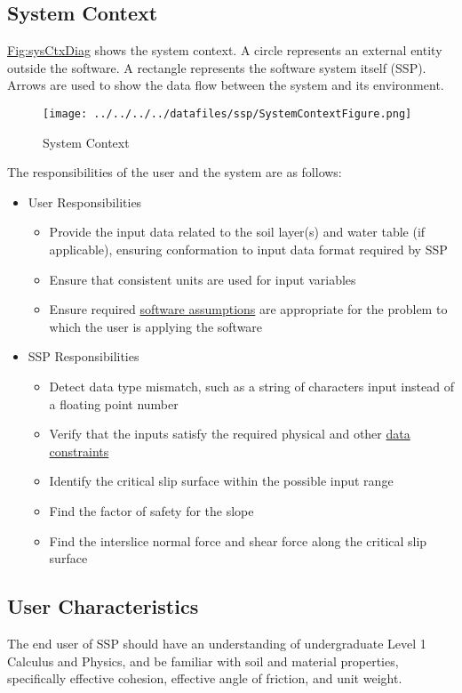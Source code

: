 \documentclass[12pt]{article}
\begin{document}
\subsection{System Context}
\label{Sec:SysContext}
\hyperref[Figure:sysCtxDiag]{Fig:sysCtxDiag} shows the system context. A circle represents an external entity outside the software. A rectangle represents the software system itself (SSP). Arrows are used to show the data flow between the system and its environment.

\begin{figure}
\begin{center}
\texttt{[image: ../../../../datafiles/ssp/SystemContextFigure.png]}
\caption{System Context}
\label{Figure:sysCtxDiag}
\end{center}
\end{figure}
The responsibilities of the user and the system are as follows:

\begin{itemize}
\item{User Responsibilities}
\begin{itemize}
\item{Provide the input data related to the soil layer(s) and water table (if applicable), ensuring conformation to input data format required by SSP}
\item{Ensure that consistent units are used for input variables}
\item{Ensure required \hyperref[Sec:Assumps]{software assumptions} are appropriate for the problem to which the user is applying the software}
\end{itemize}
\item{SSP Responsibilities}
\begin{itemize}
\item{Detect data type mismatch, such as a string of characters input instead of a floating point number}
\item{Verify that the inputs satisfy the required physical and other \hyperref[Sec:DataConstraints]{data constraints}}
\item{Identify the critical slip surface within the possible input range}
\item{Find the factor of safety for the slope}
\item{Find the interslice normal force and shear force along the critical slip surface}
\end{itemize}
\end{itemize}
\subsection{User Characteristics}
\label{Sec:UserChars}
The end user of SSP should have an understanding of undergraduate Level 1 Calculus and Physics, and be familiar with soil and material properties, specifically effective cohesion, effective angle of friction, and unit weight.
\end{document}
